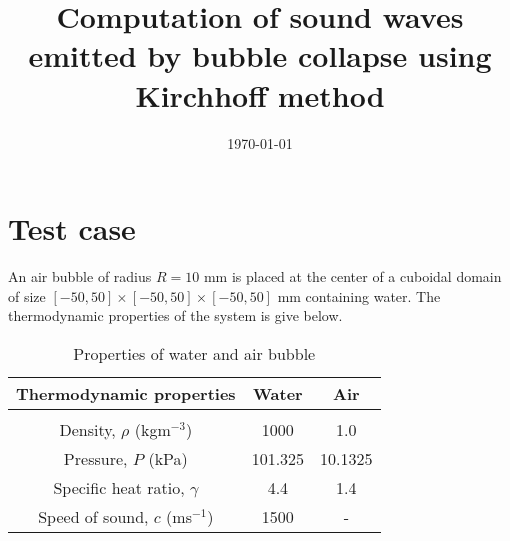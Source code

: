 \documentclass[a4paper]{article}
\title{Computation of sound waves emitted by bubble collapse using Kirchhoff method}
\date{\today}
\begin{document}
\maketitle
\section{Test case}

An air bubble of radius $R = 10$ mm is placed at the center of a cuboidal domain of size $[-50, 50] \times [-50, 50] \times [-50, 50]$ mm containing water. The thermodynamic properties of the system is give below. 

\begin{table}[h!]
    \begin{center}
        \begin{tabular}{ccc}
            \hline
            Thermodynamic properties      & Water   & Air     \\
            \hline
                                          &         &         \\
            Density, $\rho$ (kgm$^{-3}$)  & 1000    & 1.0     \\
            Pressure, $P$ (kPa)           & 101.325 & 10.1325 \\
            Specific heat ratio, $\gamma$ & 4.4     & 1.4     \\
            Speed of sound,      $c$  (ms$^{-1}$)     & 1500    &  -       \\
            \hline
        \end{tabular}

        \caption{Properties of water and air bubble}
    \end{center}
\end{table}




\printbibliography
\end{document}
